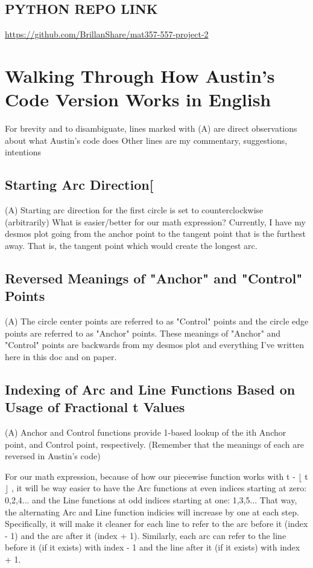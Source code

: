 \documentclass[sigconf]{acmart}
\begin{document}
\subsection{PYTHON REPO LINK}
\href{https://github.com/BrillanShare/mat357-557-project-2}{https://github.com/BrillanShare/mat357-557-project-2}



\section{Walking Through How Austin's Code Version Works in English}

For brevity and to disambiguate, lines marked with (A) are direct observations about what Austin's code does
Other lines are my commentary, suggestions, intentions

\subsection{Starting Arc Direction[}
(A) Starting arc direction for the first circle is set to counterclockwise (arbitrarily)
What is easier/better for our math expression? Currently, I have my desmos plot going from the anchor point to the tangent point that is the furthest away. That is, the tangent point which would create the longest arc.

\subsection{Reversed Meanings of "Anchor" and "Control" Points}
(A) The circle center points are referred to as "Control" points and the circle edge points are referred to as "Anchor" points.
These meanings of "Anchor" and "Control" points are backwards from my desmos plot and everything I've written here in this doc and on paper.

\subsection{Indexing of Arc and Line Functions Based on Usage of Fractional t Values}
(A) Anchor and Control functions provide 1-based lookup of the ith Anchor point, and Control point, respectively. (Remember that the meanings of each are reversed in Austin's code)

For our math expression, because of how our piecewise function works with t - $\lfloor$ t $\rfloor$ , it will be way easier to have the Arc functions at even indices starting at zero: 0,2,4... and the Line functions at odd indices starting at one: 1,3,5... That way, the alternating Arc and Line function indicies will increase by one at each step. Specifically, it will make it cleaner for each line to refer to the arc before it (index - 1) and the arc after it (index + 1). Similarly, each arc can refer to the line before it (if it exists) with index - 1 and the line after it (if it exists) with index + 1.
\end{document}
